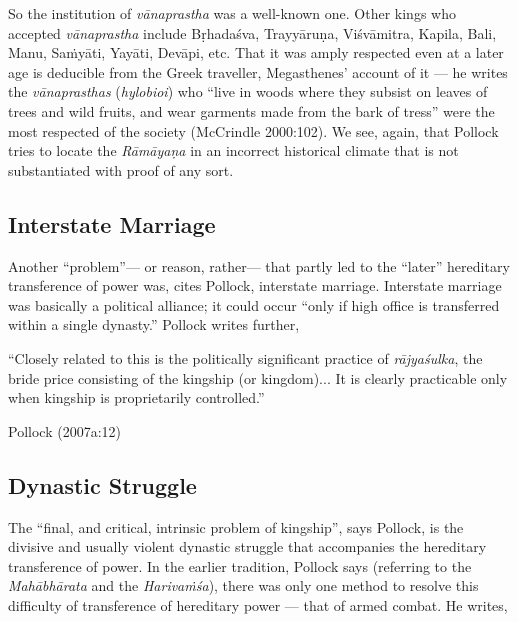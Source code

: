 So the institution of {\sl vānaprastha} was a well-known one. Other kings who accepted {\sl vānaprastha} include Bṛhadaśva, Trayyāruṇa, Viśvāmitra, Kapila, Bali, Manu, Saṁyāti, Yayāti, Devāpi, etc. That it was amply respected even at a later age is deducible from the Greek traveller, Megasthenes’ account of it --- he writes the {\sl vānaprasthas} ({\sl hylobioi}) who “live in woods where they subsist on leaves of trees and wild fruits, and wear garments made from the bark of tress” were the most respected of the society (McCrindle 2000:102).  We see, again, that Pollock tries to locate the {\sl Rāmāyaṇa} in an incorrect historical climate that is not substantiated with proof of any sort.\\[-21pt] 
\vskip 4pt

\subsection{Interstate Marriage}\label{sec1.2.2}

Another “problem”--- or reason, rather--- that partly led to the “later” hereditary transference of power was, cites Pollock, interstate marriage. Interstate marriage was basically a political alliance; it could occur “only if high office is transferred within a single dynasty.” Pollock writes further, 

\begin{myquote}
“Closely related to this is the politically significant practice of {\sl rājyaśulka}, the bride price consisting of the kingship (or kingdom)... It is clearly practicable only when kingship is proprietarily controlled.”

\hfill Pollock (2007a:12)

\vskip -1cm
\end{myquote}


\subsection{Dynastic Struggle}\label{sec1.2.3}

The “final, and critical, intrinsic problem of kingship”, says Pollock, is the divisive and usually violent dynastic struggle that accompanies the hereditary transference of power. In the earlier tradition, Pollock says (referring to the {\sl Mahābhārata} and the {\sl Harivaṁśa}), there was only one method to resolve this difficulty of transference of hereditary power --- that of armed combat. He writes,

